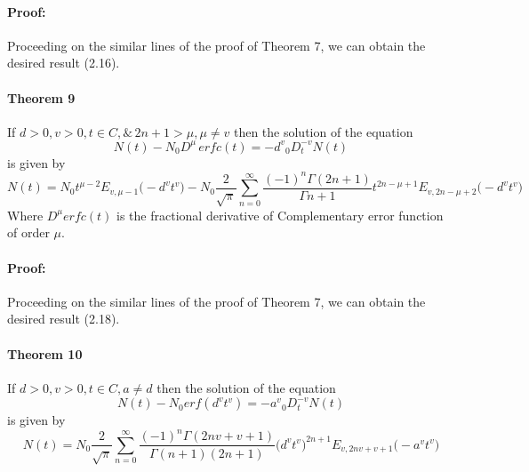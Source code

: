 \documentclass{article}
\begin{document}
\paragraph{Proof:}
Proceeding on the similar lines of the proof of Theorem 7, we can obtain the desired result (2.16).

\paragraph{Theorem 9}
If $d > 0, v > 0, t \in C, \& \,{2n+1} > \mu , \mu \neq {v} $ then the solution of the equation
\begin{equation}
    N(t) - {{N_0}D^{\mu}} \, erfc(t) = {-d^v}{_0D_t^{-v}}N(t)
\end{equation}
is given by
\begin{equation}
    N(t)
    =N_0
    t^{{\mu}-2}
    E_{v, {\mu} - 1}
    {\big(-{{d^v}}{t^v}\big)}
    -N_0{\frac{2}{\sqrt{\pi}}}
    \sum_{n = 0}^{\infty}
    \frac{(-1)^n\Gamma{(2n+1)}}{\Gamma{n+1}}
    t^{2n-{\mu}+1}
    E_{v, 2n-{\mu}+2}
    \big(-{d^v}{t^v})
\end{equation}
Where $D^{\mu}erfc(t)$ is the fractional derivative of Complementary error function of order $\mu$.
\paragraph{Proof:}
Proceeding on the similar lines of the proof of Theorem 7, we can obtain the desired result (2.18).

\paragraph{Theorem 10}
If $d > 0, v > 0, t \in C, a \neq d $ then the solution of the equation
\begin{equation}
    N(t) - {N_0}erf({d^v}{t^v}) = {-a^v}{_0D_t^{-v}}N(t)
\end{equation}
is given by
\begin{equation}
    N(t) = N_0
    {\frac{2}{\sqrt{\pi}}}
    \sum_{n = 0}^{\infty}
    \frac{(-1)^n\Gamma{(2nv+v+1)}}{\Gamma{(n+1)}(2n+1)}
    \big({d^v}{t^v}\big)^{2n+1}
    E_{v, 2nv+v+1}
    \big(-{a^v}{t^v}\big)
\end{equation}
\end{document}
